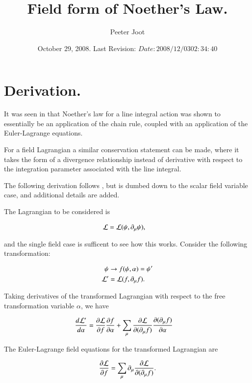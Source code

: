 \documentclass{article}
\title{Field form of Noether's Law.}
\author{Peeter Joot}
\date{ October 29, 2008.  Last Revision: $Date: 2008/12/03 02:34:40 $ }
\begin{document}
\maketitle{}
\tableofcontents

\section{ Derivation. }

It was seen in 
\cite{PJEulerLagrange} 
that Noether's law for a line integral action was shown
to essentially be an application of the chain rule, coupled with
an application of the Euler-Lagrange equations.

For a field Lagrangian a similar conservation statement can be made, where
it takes the form of a divergence relationship instead of derivative
with respect to the integration parameter associated with the line integral.

The following derivation follows \cite{doran2003gap}, but is dumbed down to the scalar field variable case, and
additional details are added.

The Lagrangian to be considered is

\begin{align*}
\mathcal{L} &= \mathcal{L}(\psi, \partial_\mu \psi),
\end{align*}

and the single field case is sufficent to see how this works.  Consider the following transformation:

\begin{align*}
\psi &\rightarrow f(\psi, \alpha) = \psi' \\
\mathcal{L}' &= \mathcal{L}(f, \partial_\mu f).
\end{align*}

Taking derivatives of the transformed Lagrangian with respect to the free transformation variable $\alpha$, we have

\begin{align}\label{eqn:noetherschain}
\frac{d\mathcal{L}'}{d\alpha}
&= \frac{\partial {\mathcal{L}}}{\partial {f}}\frac{\partial {f}}{\partial {\alpha}} + \sum_\mu \frac{\partial {\mathcal{L}}}{\partial {(\partial_\mu f)}}\frac{\partial {(\partial_\mu f)}}{\partial {\alpha}}
\end{align}

The Euler-Lagrange field equations for the transformed Lagrangian are

\begin{align}\label{eqn:eulerLag}
\frac{\partial {\mathcal{L}}}{\partial {f}} = \sum_\mu \partial_\mu \frac{\partial {\mathcal{L}}}{\partial {(\partial_\mu f)}}.
\end{align}
\end{document}
